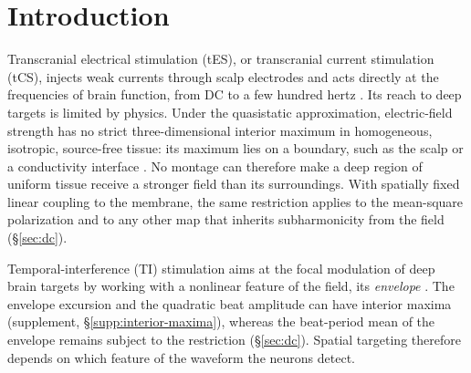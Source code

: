 
\section{Introduction}
Transcranial electrical stimulation (tES), or transcranial current stimulation (tCS),
injects weak currents through scalp electrodes \cite{ruffini2013} and acts directly at
the frequencies of brain function, from DC to a few hundred hertz
\cite{reato2010,liu2018,krause2023}. Its reach to deep targets is limited
by physics. Under the quasistatic approximation, electric-field strength has no strict
three-dimensional interior maximum in homogeneous, isotropic, source-free tissue: its
maximum lies on a boundary, such as the scalp or a conductivity interface
\cite{heller1992}. No montage can therefore make a deep region of uniform tissue receive
a stronger field than its surroundings. With spatially fixed linear coupling to the
membrane, the same restriction applies to the mean-square polarization and to any other
map that inherits subharmonicity from the field (\S\ref{sec:dc}).

Temporal-interference (TI) stimulation aims at the focal modulation of deep brain
targets by working with a nonlinear feature of the field, its \textit{envelope}
\cite{grossman2017}. The envelope excursion and the quadratic beat amplitude can have
interior maxima (supplement, \S\ref{supp:interior-maxima}), whereas the beat-period mean
of the envelope remains subject to the restriction (\S\ref{sec:dc}). Spatial targeting
therefore depends on which feature of the waveform the neurons detect.

